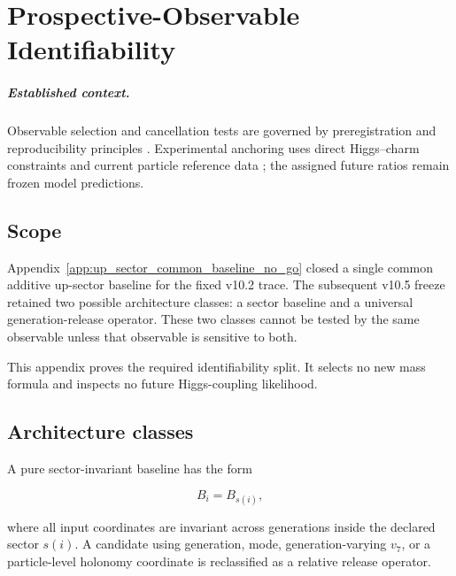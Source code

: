 \chapter{Prospective-Observable Identifiability}
\label{app:observable_identifiability}
\label{app:prospective_observable_identifiability}


\paragraph{Established context.}
Observable selection and cancellation tests are governed by preregistration and
reproducibility principles \cite{Nosek2018,Munafo2017,Stark2018}.  Experimental
anchoring uses direct Higgs--charm constraints and current particle reference data
\cite{ATLAS2022Charm,PDG2024}; the assigned future ratios remain frozen model
predictions.

\section{Scope}

Appendix~\ref{app:up_sector_common_baseline_no_go} closed a single common
additive up-sector baseline for the fixed v10.2 trace.  The subsequent v10.5
freeze retained two possible architecture classes: a sector baseline and a
universal generation-release operator.  These two classes cannot be tested by
the same observable unless that observable is sensitive to both.

This appendix proves the required identifiability split.  It selects no new
mass formula and inspects no future Higgs-coupling likelihood.

\section{Architecture classes}

A pure sector-invariant baseline has the form

\begin{equation}
B_i=B_{s(i)},
\label{eq:sector_invariant_baseline}
\end{equation}

where all input coordinates are invariant across generations inside the
declared sector $s(i)$.  A candidate using generation, mode, generation-varying
$v_7$, or a particle-level holonomy coordinate is reclassified as a relative
release operator.

